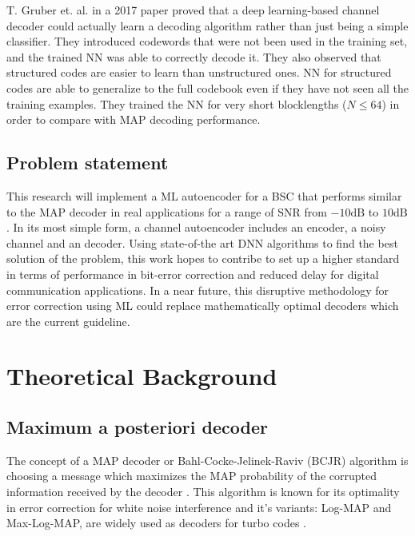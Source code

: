 \documentclass[conference]{IEEEtran}
\begin{document}
    
T. Gruber et. al. in a 2017 paper \cite{2018} proved that a deep learning-based channel decoder could actually learn a decoding algorithm rather than just being a simple classifier. They introduced codewords that were not been used in the training set, and the trained NN was able to correctly decode it. They also observed that structured codes are easier to learn than unstructured ones. NN for structured codes are able to generalize to the full codebook even if they have not seen all the training examples. They trained the NN for very short blocklengths ($N \leq 64$) in order to compare with MAP decoding performance.


\subsection{Problem statement}

This research will implement a ML autoencoder for a  BSC that performs similar to the MAP decoder in real applications for a range of SNR from $-10 \text{dB}$ to $10 \text{dB}$. In its most simple form, a channel autoencoder includes an encoder, a noisy channel and an decoder. Using state-of-the art DNN algorithms to find the best solution of the problem, this work hopes to contribe to set up a higher standard in terms of performance in bit-error correction and reduced delay for digital communication applications. In a near future, this disruptive methodology for error correction using ML could replace mathematically optimal decoders which are the current guideline.



\section{Theoretical Background}


\subsection{Maximum a posteriori decoder}


The concept of a MAP decoder or Bahl-Cocke-Jelinek-Raviv (BCJR) algorithm is choosing a message which maximizes the MAP probability of the corrupted information received  by the decoder \cite{b4}. This algorithm is known for its optimality in error correction for white noise interference and it's variants: Log-MAP and Max-Log-MAP, are widely used as decoders for turbo codes \cite{b7}. 
\end{document}
